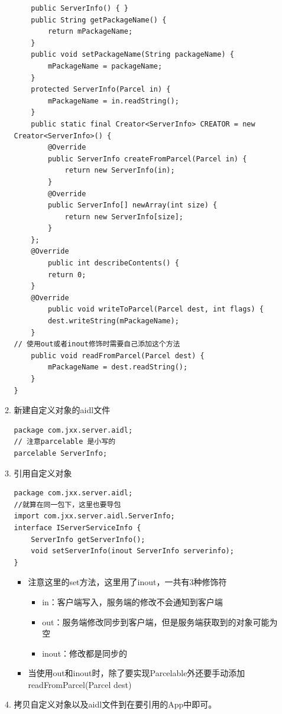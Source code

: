 \documentclass[9pt, b5paper]{article}
\begin{document}
\begin{enumerate}
\begin{enumerate}
\begin{verbatim}
    public ServerInfo() { }
    public String getPackageName() {
        return mPackageName;
    }
    public void setPackageName(String packageName) {
        mPackageName = packageName;
    }
    protected ServerInfo(Parcel in) {
        mPackageName = in.readString();
    }
    public static final Creator<ServerInfo> CREATOR = new Creator<ServerInfo>() {
        @Override
        public ServerInfo createFromParcel(Parcel in) {
            return new ServerInfo(in);
        }
        @Override
        public ServerInfo[] newArray(int size) {
            return new ServerInfo[size];
        }
    };
    @Override
        public int describeContents() {
        return 0;
    }
    @Override
        public void writeToParcel(Parcel dest, int flags) {
        dest.writeString(mPackageName);
    }
// 使用out或者inout修饰时需要自己添加这个方法
    public void readFromParcel(Parcel dest) {
        mPackageName = dest.readString();
    }
}
\end{verbatim}
\item 新建自定义对象的aidl文件
\label{sec-1-6-1-3-2}
\begin{verbatim}
package com.jxx.server.aidl;
// 注意parcelable 是小写的
parcelable ServerInfo;
\end{verbatim}
\item 引用自定义对象
\label{sec-1-6-1-3-3}
\begin{verbatim}
package com.jxx.server.aidl;
//就算在同一包下，这里也要导包
import com.jxx.server.aidl.ServerInfo;
interface IServerServiceInfo {
	ServerInfo getServerInfo();
	void setServerInfo(inout ServerInfo serverinfo);
}
\end{verbatim}
\begin{itemize}
\item 注意这里的set方法，这里用了inout，一共有3种修饰符
\begin{itemize}
\item in：客户端写入，服务端的修改不会通知到客户端
\item out：服务端修改同步到客户端，但是服务端获取到的对象可能为空
\item inout：修改都是同步的
\end{itemize}
\item 当使用out和inout时，除了要实现Parcelable外还要手动添加readFromParcel(Parcel dest)
\end{itemize}
\item 拷贝自定义对象以及aidl文件到在要引用的App中即可。
\label{sec-1-6-1-3-4}

\end{enumerate}
\end{enumerate}
\end{document}
